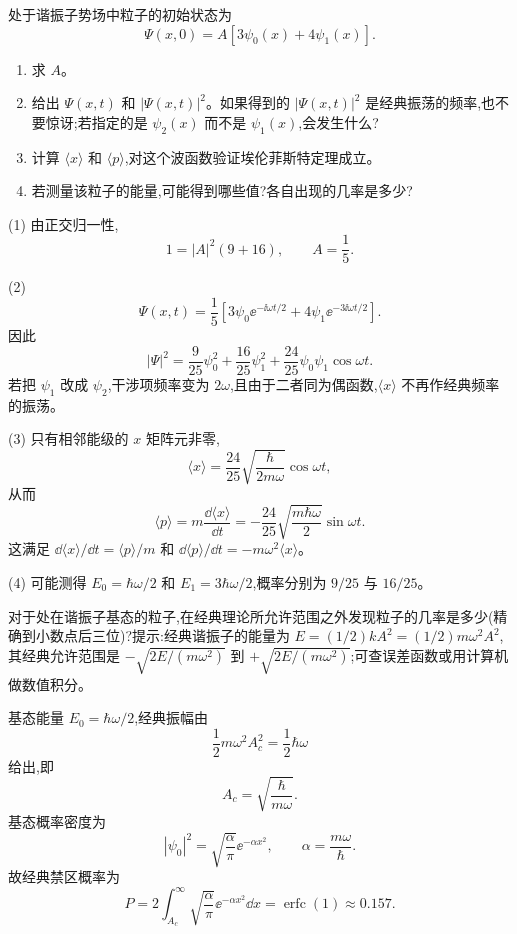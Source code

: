 \begin{question}
处于谐振子势场中粒子的初始状态为
\[
\Psi(x,0)=A[3\psi_0(x)+4\psi_1(x)].
\]
\begin{enumerate}
\item 求 $A$。
\item 给出 $\Psi(x,t)$ 和 $|\Psi(x,t)|^2$。如果得到的 $|\Psi(x,t)|^2$ 是经典振荡的频率,也不要惊讶;若指定的是 $\psi_2(x)$ 而不是 $\psi_1(x)$,会发生什么?
\item 计算 $\langle x\rangle$ 和 $\langle p\rangle$,对这个波函数验证埃伦菲斯特定理成立。
\item 若测量该粒子的能量,可能得到哪些值?各自出现的几率是多少?
\end{enumerate}
\end{question}
\begin{solution}
(1) 由正交归一性,
\[
1=|A|^2(9+16),
\qquad A=\frac15.
\]

(2) 
\[
\Psi(x,t)=\frac15\left[3\psi_0\ee^{-\ii\omega t/2}+4\psi_1\ee^{-3\ii\omega t/2}\right].
\]
因此
\[
|\Psi|^2=\frac{9}{25}\psi_0^2+\frac{16}{25}\psi_1^2+\frac{24}{25}\psi_0\psi_1\cos\omega t.
\]
若把 $\psi_1$ 改成 $\psi_2$,干涉项频率变为 $2\omega$,且由于二者同为偶函数,$\langle x\rangle$ 不再作经典频率的振荡。

(3) 只有相邻能级的 $x$ 矩阵元非零,
\[
\langle x\rangle=\frac{24}{25}\sqrt{\frac{\hbar}{2m\omega}}\cos\omega t,
\]
从而
\[
\langle p\rangle=m\frac{\dd\langle x\rangle}{\dd t}
=-\frac{24}{25}\sqrt{\frac{m\hbar\omega}{2}}\sin\omega t.
\]
这满足 $\dd\langle x\rangle/\dd t=\langle p\rangle/m$ 和 $\dd\langle p\rangle/\dd t=-m\omega^2\langle x\rangle$。

(4) 可能测得 $E_0=\hbar\omega/2$ 和 $E_1=3\hbar\omega/2$,概率分别为 $9/25$ 与 $16/25$。
\end{solution}

\begin{question}
对于处在谐振子基态的粒子,在经典理论所允许范围之外发现粒子的几率是多少(精确到小数点后三位)?提示:经典谐振子的能量为 $E=(1/2)kA^2=(1/2)m\omega^2A^2$,其经典允许范围是 $-\sqrt{2E/(m\omega^2)}$ 到 $+\sqrt{2E/(m\omega^2)}$;可查误差函数或用计算机做数值积分。
\end{question}
\begin{solution}
基态能量 $E_0=\hbar\omega/2$,经典振幅由
\[
\frac12m\omega^2A_c^2=\frac12\hbar\omega
\]
给出,即
\[
A_c=\sqrt{\frac{\hbar}{m\omega}}.
\]
基态概率密度为
\[
|\psi_0|^2=\sqrt{\frac{\alpha}{\pi}}\ee^{-\alpha x^2},
\qquad \alpha=\frac{m\omega}{\hbar}.
\]
故经典禁区概率为
\[
P=2\int_{A_c}^{\infty}\sqrt{\frac{\alpha}{\pi}}\ee^{-\alpha x^2}\dd x
=\operatorname{erfc}(1)
\approx 0.157.
\]
\end{solution}

